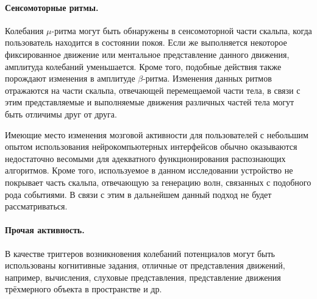 \documentclass[12pt,a4paper,oneside,fleqn,leqno]{article}
\begin{document}
	\paragraph{Сенсомоторные ритмы.}
	\par Колебания $\mu$-ритма могут быть обнаружены в сенсомоторной части скальпа, когда пользователь находится в состоянии покоя. Если же выполняется некоторое фиксированное движение или ментальное представление данного движения, амплитуда колебаний уменьшается. Кроме того, подобные действия также порождают изменения в амплитуде $\beta$-ритма. Изменения данных ритмов отражаются на части скальпа, отвечающей перемещаемой части тела, в связи с этим представляемые и выполняемые движения различных частей тела могут быть отличимы друг от друга.
	\par Имеющие место изменения мозговой активности для пользователей с небольшим опытом использования нейрокомпьютерных интерфейсов обычно оказываются недостаточно весомыми для адекватного функционирования распознающих алгоритмов. Кроме того, используемое в данном исследовании устройство не покрывает часть скальпа, отвечающую за генерацию волн, связанных с подобного рода событиями. В связи с этим в дальнейшем данный подход не будет рассматриваться.

	\paragraph{Прочая активность.}
	\par В качестве триггеров возникновения колебаний потенциалов могут быть использованы когнитивные задания, отличные от представления движений, например, вычисления, слуховые представления, представление движения трёхмерного объекта в пространстве и др.
\end{document}

